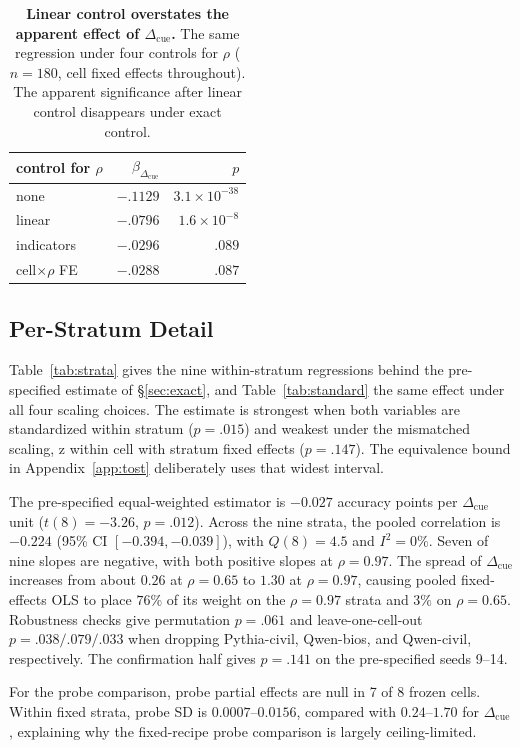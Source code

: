 \documentclass[11pt]{article}
\newcommand{\cued}{\ensuremath{\Delta_{\mathrm{cue}}}}
\begin{document}
\begin{table}[t]
\centering\small
\begin{tabular}{lrr}
\toprule
control for $\rho$ & $\beta_{\cued}$ & $p$ \\
\midrule
none              & $-.1129$ & $3.1{\times}10^{-38}$ \\
linear            & $-.0796$ & $1.6{\times}10^{-8}$ \\
indicators        & $-.0296$ & $.089$ \\
cell$\times\rho$ FE & $-.0288$ & $.087$ \\
\bottomrule
\end{tabular}
\caption{\textbf{Linear control overstates the apparent effect of \cued{}.}
The same regression under four controls for $\rho$ ($n{=}180$, cell fixed
effects throughout). The apparent significance after linear control disappears
under exact control.}
\label{tab:ladder}
\end{table}

\subsection{Per-Stratum Detail}
\label{app:strata}
Table~\ref{tab:strata} gives the nine within-stratum regressions behind the
pre-specified estimate of \S\ref{sec:exact}, and Table~\ref{tab:standard}
the same effect under all four scaling choices. The estimate is strongest
when both variables are standardized within stratum ($p{=}.015$) and weakest
under the mismatched scaling, z within cell with stratum fixed effects
($p{=}.147$). The equivalence bound in Appendix~\ref{app:tost} deliberately
uses that widest interval.

The pre-specified equal-weighted estimator is $-0.027$ accuracy points per
\cued{} unit ($t(8){=}{-}3.26$, $p{=}.012$). Across the nine strata, the pooled
correlation is $-0.224$ (95\% CI $[-0.394,-0.039]$), with
$Q(8){=}4.5$ and $I^2{=}0\%$. Seven of nine slopes are negative, with both
positive slopes at $\rho{=}0.97$. The spread of \cued{} increases from about
$0.26$ at $\rho{=}0.65$ to $1.30$ at $\rho{=}0.97$, causing pooled
fixed-effects OLS to place $76\%$ of its weight on the $\rho{=}0.97$ strata and
$3\%$ on $\rho{=}0.65$. Robustness checks give permutation $p{=}.061$ and leave-one-cell-out
$p{=}.038/.079/.033$ when dropping Pythia-civil, Qwen-bios, and Qwen-civil,
respectively. The confirmation half gives $p{=}.141$ on the pre-specified
seeds 9--14.

For the probe comparison, probe partial effects are null in 7 of 8 frozen
cells. Within fixed strata, probe SD is $0.0007$--$0.0156$, compared with
$0.24$--$1.70$ for \cued{}, explaining why the fixed-recipe probe comparison
is largely ceiling-limited.
\end{document}
